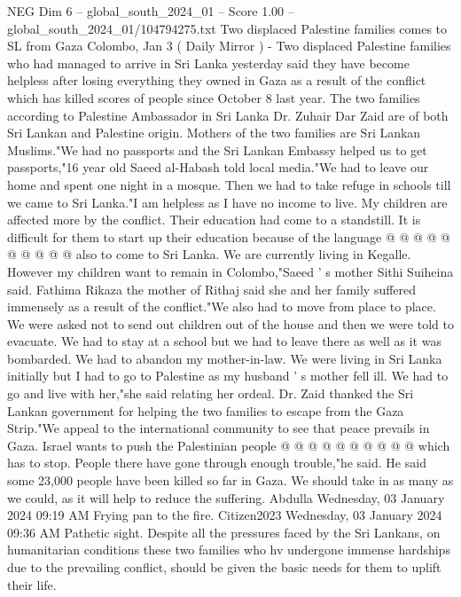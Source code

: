 \begin{textsample}{NEG Dim 6 – global\_south\_2024\_01 – Score 1.00 – global\_south\_2024\_01/104794275.txt}  \label{ex:f6_neg_376}
Two displaced Palestine families comes to SL from Gaza Colombo, Jan 3 ( Daily Mirror ) - Two displaced Palestine families who had managed to arrive in Sri Lanka yesterday said they have become helpless after losing everything they owned in Gaza as a result of the conflict which has killed scores of people since October 8 last year.
The two families according to Palestine Ambassador in Sri Lanka Dr.
Zuhair Dar Zaid are of both Sri Lankan and Palestine origin.
Mothers of the two families are Sri Lankan Muslims."We had no passports and the Sri Lankan Embassy helped us to get passports,"16 year old Saeed al-Habash told local media."We had to leave our home and spent one night in a mosque.
Then we had to take refuge in schools till we came to Sri Lanka."I am helpless as I have no income to live.
My children are affected more by the conflict.
Their education had come to a standstill.
It is difficult for them to start up their education because of the language @ @ @ @ @ @ @ @ @ @ also to come to Sri Lanka.
We are currently living in Kegalle.
However my children want to remain in Colombo,"Saeed ' s mother Sithi Suiheina said.
Fathima Rikaza the mother of Rithaj said she and her family suffered immensely as a result of the conflict."We also had to move from place to place.
We were asked not to send out children out of the house and then we were told to evacuate.
We had to stay at a school but we had to leave there as well as it was bombarded.
We had to abandon my mother-in-law.
We were living in Sri Lanka initially but I had to go to Palestine as my husband ' s mother fell ill.
We had to go and live with her,"she said relating her ordeal.
Dr.
Zaid thanked the Sri Lankan government for helping the two families to escape from the Gaza Strip."We appeal to the international community to see that peace prevails in Gaza.
Israel wants to push the Palestinian people @ @ @ @ @ @ @ @ @ @ which has to stop.
People there have gone through enough trouble,"he said.
He said some 23,000 people have been killed so far in Gaza.
We should take in as many as we could, as it will help to reduce the suffering.
Abdulla Wednesday, 03 January 2024 09:19 AM Frying pan to the fire.
Citizen2023 Wednesday, 03 January 2024 09:36 AM Pathetic sight.
Despite all the pressures faced by the Sri Lankans, on humanitarian conditions these two families who hv undergone immense hardships due to the prevailing conflict, should be given the basic needs for them to uplift their life.

\end{textsample}
